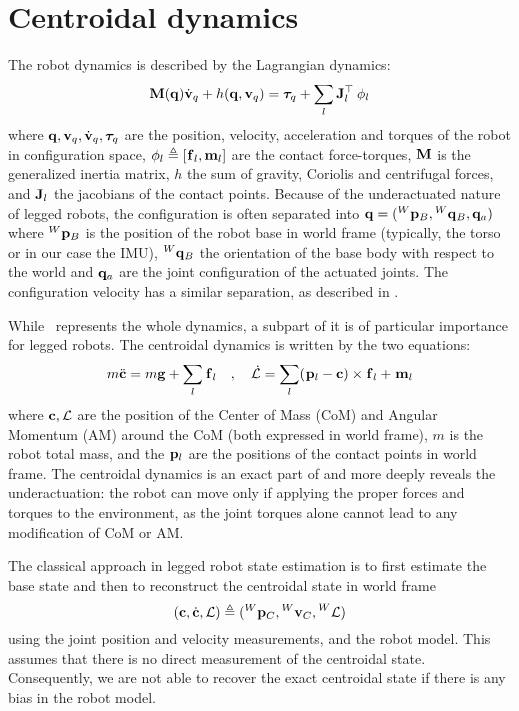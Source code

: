 \section{Centroidal dynamics}
\label{sec:centroidal_dynamics}
The robot dynamics is described by the Lagrangian dynamics:
%
\begin{equation}\label{eq:wbdyn}
  {\bf M}({\bf q}) \dot{{\bf v}}_q + h({\bf q},{\bf v}_q) = \bm\tau_q + \sum_l {\bf J}_l^{\top} \prescript{}{}{\bf \phi}_{l}
\end{equation}
%
where ${\bf q},{\bf v}_q,\dot{{\bf v}}_q,\bm\tau_q$ are the position, velocity, acceleration and torques of the robot in configuration space,
$\prescript{}{}{\bf \phi}_{l} \triangleq [\prescript{}{}{{\bf f}}_{l},{\bf m}_l]$ are the contact force-torques,
${\bf M}$ is the generalized inertia matrix, $h$ the sum of gravity, Coriolis and centrifugal forces, and ${\bf J}_l$ the jacobians of the contact points.
Because of the underactuated nature of legged robots, the configuration is often separated into ${\bf q}=(\prescript{W}{}{{\bf p}}_{B}, \prescript{W}{}{{\bf q}}_B ,{\bf q}_a)$ where $\prescript{W}{}{{\bf p}}_{B}$ 
is the position of the robot base in world frame (typically, the torso or in our case the IMU), $\prescript{W}{}{{\bf q}}_B$ the orientation of the base body with respect 
to the world and ${\bf q}_a$ are the joint configuration of the actuated joints. The configuration velocity has a similar separation, as described in .

While~ represents the whole dynamics, a subpart of it is of particular importance for legged robots.
The centroidal dynamics is written by the two equations:
%
\begin{equation}
    m \ddot{{\bf c}} = m {\bf g} + \sum_l \prescript{}{}{{\bf f}}_{l} \quad , \quad
\mathcal{\dot{L}} = \sum_l (\prescript{}{}{{\bf p}}_{l} - {\bf c}) \times \prescript{}{}{{\bf f}}_{l} + \prescript{}{}{\bf m}_{l}
\label{eq:NewtonEuler}
\end{equation}
%
where ${\bf c},\mathcal{L}$ are the position of the Center of Mass (CoM) and Angular Momentum (AM) around the CoM (both expressed in world frame), $m$ is the robot total mass, 
and the $\prescript{}{}{{\bf p}}_{l}$ are the positions of the contact points in world frame. The centroidal dynamics is an exact part of  and more deeply reveals 
the underactuation: the robot can move only if applying the proper forces and torques to the environment, as the joint torques alone cannot lead to any modification 
of CoM or AM.

The classical approach in legged robot state estimation is to first estimate the base state and then to reconstruct the centroidal state in world frame
%
\begin{equation}
    ({\bf c},\dot{{\bf c}},\mathcal{L}) \triangleq (\prescript{W}{}{{\bf p}}_{C},\prescript{W}{}{{\bf v}}_{C},\prescript{W}{}{\mathcal{L}})
\end{equation}
%
using the joint position and velocity measurements, and the robot model. This assumes that there is no direct measurement of the centroidal state.
Consequently, we are not able to recover the exact centroidal state if there is any bias in the robot model.

